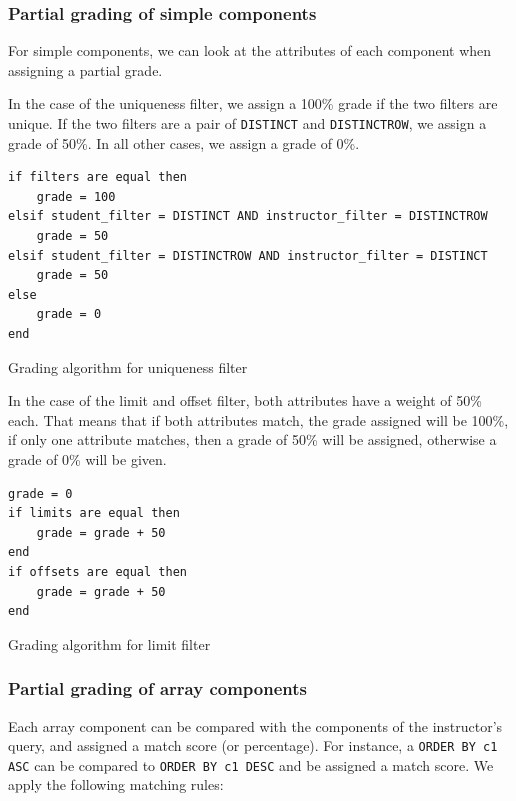 \subsubsection{Partial grading of simple components}

For simple components, we can look at the attributes of each component when assigning a partial grade.

In the case of the uniqueness filter, we assign a 100\% grade if the two filters are unique. If the two filters are a pair of \texttt{DISTINCT} and \texttt{DISTINCTROW}, we assign a grade of 50\%. In all other cases, we assign a grade of 0\%.
\begin{code}
\begin{verbatim}
if filters are equal then
    grade = 100
elsif student_filter = DISTINCT AND instructor_filter = DISTINCTROW
    grade = 50
elsif student_filter = DISTINCTROW AND instructor_filter = DISTINCT
    grade = 50
else
    grade = 0
end
\end{verbatim}
\caption{Grading algorithm for uniqueness filter}
\end{code}

In the case of the limit and offset filter, both attributes have a weight of 50\% each. That means that if both attributes match, the grade assigned will be 100\%, if only one attribute matches, then a grade of 50\% will be assigned, otherwise a grade of 0\% will be given.
\begin{code}
\begin{verbatim}
grade = 0
if limits are equal then
    grade = grade + 50
end
if offsets are equal then
    grade = grade + 50
end
\end{verbatim}
\caption{Grading algorithm for limit filter}
\end{code}
\subsubsection{Partial grading of array components}

Each array component can be compared with the components of the instructor's query, and assigned a match score (or percentage). For instance, a \texttt{ORDER BY c1 ASC} can be compared to \texttt{ORDER BY c1 DESC} and be assigned a match score. We apply the following matching rules:

